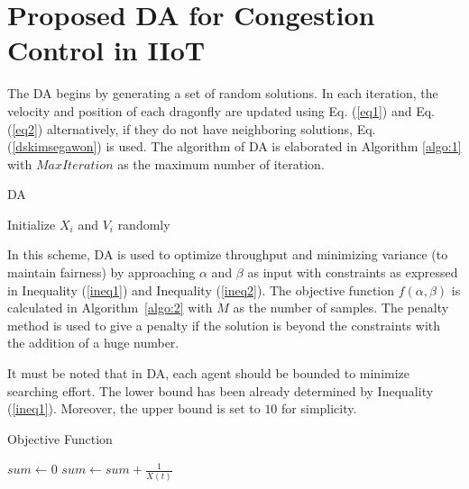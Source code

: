 \section{Proposed DA for Congestion Control in IIoT}


The DA begins by generating a set of random solutions. In each iteration, the velocity and position of each dragonfly are updated using Eq. (\ref{eq1}) and Eq. (\ref{eq2}) alternatively, if they do not have neighboring solutions, Eq.
(\ref{dskimsegawon}) is used. The algorithm of DA is elaborated in Algorithm \ref{algo:1} with $MaxIteration$ as the maximum number of iteration.

\begin{algorithm}
	\caption{DA}
	\label{algo:1}
	\SetAlgoLined
	
	Initialize $X_i$ and $V_i$ randomly\;
\end{algorithm}

In this scheme, DA is used to optimize throughput and minimizing variance (to maintain fairness) by approaching $\alpha$ and $\beta$ as input with constraints as expressed in Inequality (\ref{ineq1}) and Inequality (\ref{ineq2}). The objective function $f(\alpha, \beta)$ is calculated in Algorithm~\ref{algo:2} with $M$ as the number of samples. The penalty method is used to give a penalty if the solution is beyond the constraints with the addition of a huge number. 

It must be noted that in DA, each agent should be bounded to minimize searching effort. The lower bound has been already determined by Inequality (\ref{ineq1}). Moreover, the upper bound is set to $10$ for simplicity.

\begin{algorithm}
	\caption{Objective Function}
	\label{algo:2}
	\SetAlgoLined
	\BlankLine
	$sum \leftarrow 0$\; 
	{
		$sum \leftarrow sum + \frac{1}{X(t)}$\; %
	}
\end{algorithm}